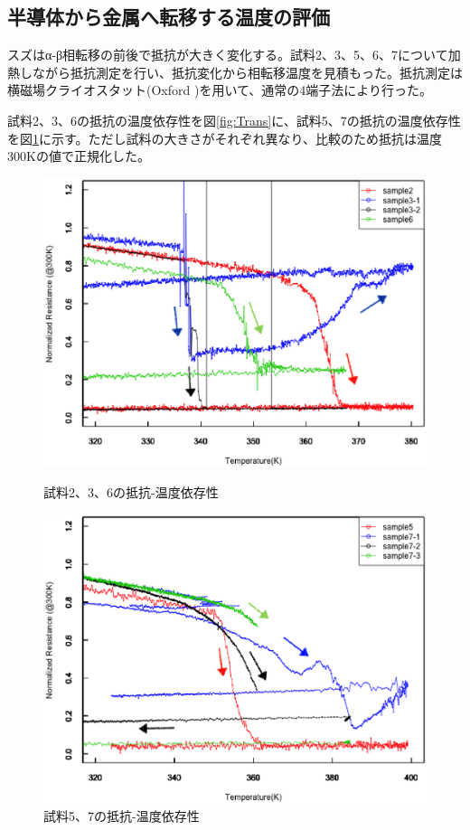 \subsection{半導体から金属へ転移する温度の評価}
スズはα-β相転移の前後で抵抗が大きく変化する。試料2、3、5、6、7について加熱しながら抵抗測定を行い、抵抗変化から相転移温度を見積もった。抵抗測定は横磁場クライオスタット(Oxford%
)を用いて、通常の4端子法により行った。

試料2、3、6の抵抗の温度依存性を図\ref{fig:Trans}に、試料5、7の抵抗の温度依存性を図\ref{fig:Trans2}に示す。ただし試料の大きさがそれぞれ異なり、比較のため抵抗は温度300Kの値で正規化した。
\begin{figure}[!h]
 \begin{minipage}{\hsize}
    \begin{center}
   \includegraphics[width=0.8\hsize]{samples/Trans.eps}
  \end{center}
  \caption{試料2、3、6の抵抗-温度依存性}
  \label{fig:Trans}
 \end{minipage}
 \begin{minipage}{\hsize}
     \begin{center}
   \includegraphics[width=0.8\hsize]{samples/Trans2.eps}
  \end{center}
  \caption{試料5、7の抵抗-温度依存性}
  \label{fig:Trans2}
   \end{minipage}
\end{figure}

